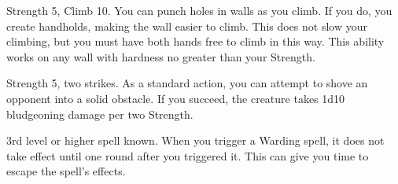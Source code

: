 \featpres Strength 5, Climb 10.
\featben You can punch holes in walls as you climb.
If you do, you create handholds, making the wall easier to climb.
This does not slow your climbing, but you must have both hands free to climb in this way.
This ability works on any wall with hardness no greater than your Strength.

\featpres Strength 5, two strikes.
\featben As a standard action, you can attempt to shove an opponent into a solid obstacle.
If you succeed, the creature takes 1d10 bludgeoning damage per two Strength.

\featpre 3rd level or higher  spell known.
\featben When you trigger a Warding spell, it does not take effect until one round after you triggered it. This can give you time to escape the spell's effects.

